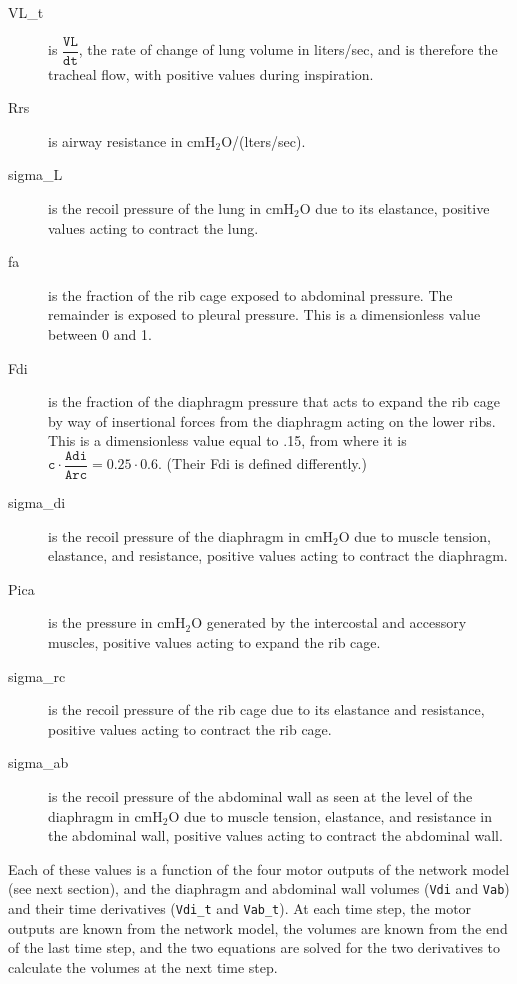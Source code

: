 \documentclass[12pt,openany,oneside]{book}
\newcommand{\ticode}[1]{\texttt{#1}}
\newcommand{\tmcode}[1]{\mathtt{#1}}
\begin{document}
\begin{description}

\hypertarget{VL_t}{}
\item[VL\_t] is $\tmcode{\dfrac{VL}{dt}}$, the rate of change of lung volume in
   liters/sec, and is
therefore the tracheal flow, with positive values during inspiration.

\item[Rrs] is airway resistance in cmH$_2$O/(lters/sec).

\item[sigma\_L] is the recoil pressure of the lung in cmH$_2$O due to its
elastance, positive values acting to contract the lung.

\item[fa] is the fraction of the rib cage exposed to abdominal
pressure. The remainder is exposed to pleural pressure. This is a
dimensionless value between 0 and 1.

\item[Fdi] is the fraction of the diaphragm pressure that acts to
  expand the rib cage by way of insertional forces from the diaphragm
  acting on the lower ribs. This is a dimensionless value equal to
  .15, from \citet{Loring01091982} where it is $\tmcode{c\cdot\dfrac{Adi}{Arc}
  = 0.25\cdot0.6}$. (Their Fdi is defined differently.)

\item[sigma\_di] is the recoil pressure of the diaphragm in cmH$_2$O due to
muscle tension, elastance, and resistance, positive values acting to
contract the diaphragm.

\item[Pica] is the pressure in cmH$_2$O generated by the intercostal and
accessory muscles, positive values acting to expand the rib cage.

\item[sigma\_rc] is the recoil pressure of the rib cage due to its elastance
and resistance, positive values acting to contract the rib cage.

\item[sigma\_ab] is the recoil pressure of the abdominal wall as seen at the
level of the diaphragm in cmH$_2$O due to muscle tension, elastance, and
resistance in the abdominal wall, positive values acting to contract
the abdominal wall.
\end{description}

Each of these values is a function of the four motor outputs of the
network model (see next section), and the diaphragm and abdominal wall
volumes (\ticode{Vdi} and \ticode{Vab}) and their time derivatives
(\ticode{Vdi\_t} and \ticode{Vab\_t}). At each time step, the motor
outputs are known from the network model, the volumes are known from
the end of the last time step, and the two equations are solved for
the two derivatives to calculate the volumes at the next time step.
\end{document}
